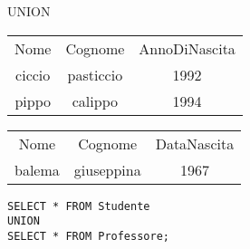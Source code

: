 \begin{frame}{UNION}
\begin{table}[h]
\centering
\begin{minipage}{.45\textwidth}
\centering
\begin{tabular}{|c|c|c|}
\hline
\rowcolor{cyan!30} \multicolumn{3}{|c|}{Studente} \\
\hline
\rowcolor{cyan!30} Nome  & Cognome & AnnoDiNascita \\
\hline
ciccio  & pasticcio & 1992 \\
pippo  & calippo & 1994 \\

\hline
\end{tabular}
\end{minipage}%
\begin{minipage}{.45\textwidth}
\centering
\begin{tabular}{|c|c|c|}
\hline
\rowcolor{cyan!30} \multicolumn{3}{|c|}{Professore} \\
\hline
\rowcolor{cyan!30} Nome  & Cognome & DataNascita \\
\hline
balema & giuseppina & 1967 \\

\hline
\end{tabular}
\end{minipage}
\end{table}
\vspace{2em}
\texttt{SELECT * FROM Studente\\UNION\\SELECT * FROM Professore;}
\end{frame}
